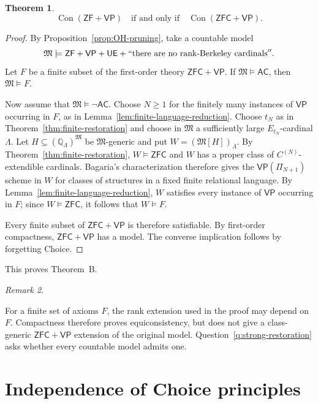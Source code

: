 \documentclass[11pt,a4paper]{amsart}
\newcommand{\VP}{\mathsf{VP}}
\newcommand{\AC}{\mathsf{AC}}
\newcommand{\ZF}{\mathsf{ZF}}
\newcommand{\ZFC}{\mathsf{ZFC}}
\newcommand{\Con}{\operatorname{Con}}
\newcommand{\UE}{\mathsf{UE}}
\theoremstyle{plain}
\newtheorem{theorem}{Theorem}[section]
\theoremstyle{definition}
\theoremstyle{remark}
\newtheorem{remark}[theorem]{Remark}
\begin{document}
\begin{theorem}\label{thm:consistency-transfer}
\[
\Con(\ZF+\VP)\quad\text{if and only if}\quad\Con(\ZFC+\VP).
\]
\end{theorem}

\begin{proof}
By Proposition~\ref{prop:OH-pruning}, take a countable model
\[
\mathfrak M\models\ZF+\VP+\UE+``\text{there are no rank-Berkeley cardinals}''.
\]
Let $F$ be a finite subset of the first-order theory $\ZFC+\VP$.  If $\mathfrak M\models\AC$, then $\mathfrak M\models F$.

Now assume that $\mathfrak M\models\neg\AC$.  Choose $N\geq1$ for the finitely many instances of $\VP$ occurring in $F$, as in Lemma~\ref{lem:finite-language-reduction}.  Choose $t_N$ as in Theorem~\ref{thm:finite-restoration} and choose in $\mathfrak M$ a sufficiently large $E_{t_N}$-cardinal $\Lambda$.  Let $H\subseteq(\mathbb Q_\Lambda)^{\mathfrak M}$ be $\mathfrak M$-generic and put $W=(\mathfrak M[H])_\Lambda$.  By Theorem~\ref{thm:finite-restoration}, $W\models\ZFC$ and $W$ has a proper class of $C^{(N)}$-extendible cardinals.  {Bagaria's characterization \cite[Theorem~4.3(2), Corollary~4.7, Theorem~4.11, and the paragraph following Theorem~4.12]{BagariaCn} therefore gives the $\VP(\Pi_{N+1})$ scheme in $W$ for classes of structures in a fixed finite relational language.  By Lemma~\ref{lem:finite-language-reduction}, $W$ satisfies every instance of $\VP$ occurring in $F$; since $W\models\ZFC$, it follows that $W\models F$.}

Every finite subset of $\ZFC+\VP$ is therefore satisfiable.  By first-order compactness, $\ZFC+\VP$ has a model.  The converse implication follows by forgetting Choice.
\end{proof}

This proves Theorem~B.

\begin{remark}\label{rem:consistency-not-uniform}

For a finite set of axioms $F$, the rank extension used in the proof may depend on $F$.  Compactness therefore proves equiconsistency, but does not give a class-generic $\ZFC+\VP$ extension of the original model.  Question~\ref{q:strong-restoration} asks whether every countable model admits one.
\end{remark}
\endgroup

\section{{Independence of Choice principles}}
\end{document}
